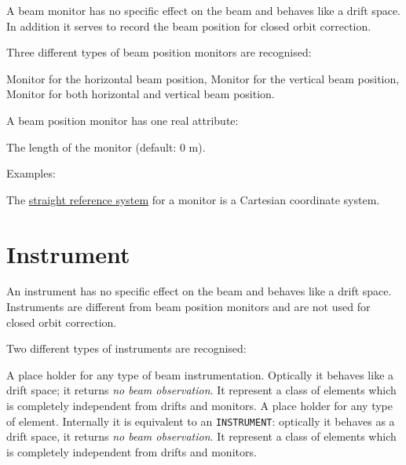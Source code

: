 {A beam monitor has no specific effect on the beam and behaves like a
drift space. 
In addition it serves to record the beam position for closed orbit
correction.

Three different types of beam position monitors are recognised:  
\begin{madlist}
    Monitor for the horizontal beam position, 
    Monitor for the vertical beam position, 
    Monitor for both horizontal and vertical beam position. 
\end{madlist}


A beam position monitor has one real attribute: 
\begin{madlist}
    The length of the monitor (default: 0 m). 
\end{madlist}

Examples: 

The \hyperref[subsec:local_straight]{straight reference system} for a
monitor is a Cartesian coordinate system.  

\section{Instrument}
\label{sec:instrument}
An instrument has no specific effect on the beam and behaves like a
drift space. 
Instruments are different from beam position monitors and are not used
for closed orbit correction. 

Two different types of instruments are recognised:  

\begin{madlist}
    A place holder for any type of beam
     instrumentation. Optically it behaves like a drift space; it
     returns \emph{no beam observation}. It represent a class of
     elements which is completely independent from drifts and monitors.  
    A place holder for any type of
     element. Internally it is equivalent to an {\tt INSTRUMENT}: 
     optically it behaves as a drift space, it returns 
     \emph{no beam observation}. It represent a class of elements 
     which is completely independent from drifts and monitors. 
\end{madlist}

}
